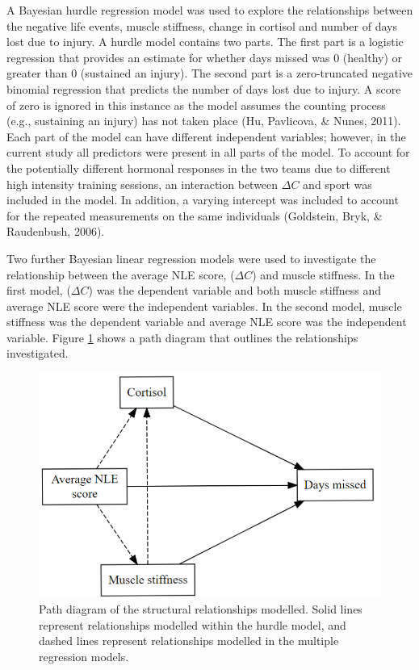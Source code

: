 \documentclass[man,floatsintext]{apa6}
\begin{document}
A Bayesian hurdle regression model was used to explore the relationships between the negative life events, muscle stiffness, change in cortisol and number of days lost due to injury.
A hurdle model contains two parts.
The first part is a logistic regression that provides an estimate for whether days missed was 0 (healthy) or greater than 0 (sustained an injury).
The second part is a zero-truncated negative binomial regression that predicts the number of days lost due to injury.
A score of zero is ignored in this instance as the model assumes the counting process (e.g., sustaining an injury) has not taken place (Hu, Pavlicova, \& Nunes, 2011).
Each part of the model can have different independent variables; however, in the current study all predictors were present in all parts of the model.
To account for the potentially different hormonal responses in the two teams due to different high intensity training sessions, an interaction between \(\Delta C\) and sport was included in the model.
In addition, a varying intercept was included to account for the repeated measurements on the same individuals (Goldstein, Bryk, \& Raudenbush, 2006).

Two further Bayesian linear regression models were used to investigate the relationship between the average NLE score, (\(\Delta C\)) and muscle stiffness.
In the first model, (\(\Delta C\)) was the dependent variable and both muscle stiffness and average NLE score were the independent variables.
In the second model, muscle stiffness was the dependent variable and average NLE score was the independent variable.
Figure \ref{fig:pathdiag} shows a path diagram that outlines the relationships investigated.

\begin{figure}[H]

{\centering \includegraphics[width=0.85\linewidth]{figs/study2/pathdiag} 

}

\caption{Path diagram of the structural relationships modelled. Solid lines represent relationships modelled within the hurdle model, and dashed lines represent relationships modelled in the multiple regression models.}\label{fig:pathdiag}
\end{figure}
\end{document}
